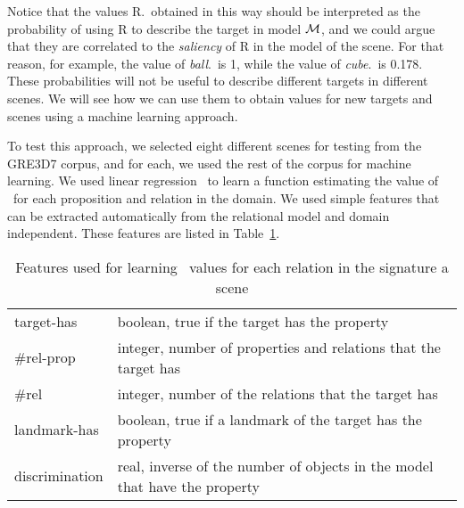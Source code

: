 Notice that the values R.\puse\ obtained in this way should be interpreted as the probability of using R to describe the target in model $\mathcal{M}$, and we could argue that they are correlated to the \emph{saliency} of R in the model of the scene.  
For that reason, for example, the value of \emph{ball}.\puse\ is 1, while the value of \emph{cube}.\puse\ is 0.178.  These probabilities will not be useful to describe different targets in different scenes.  We will see how we can use them to obtain values for new targets and scenes using a machine learning approach. 




To test this approach, we selected eight different scenes for testing from the GRE3D7 corpus, and for each, we used the rest of the corpus for machine learning. We used linear regression~\cite{Hall:WEK09} to learn a function estimating the value of \puse\ for each proposition and relation in the domain.  We used simple features that can be extracted automatically from the relational model and domain independent. These features are listed in Table~\ref{features}.  

\begin{small}
\begin{table}[h!]
\begin{center}
\begin{tabular}{|l|p{10cm}|} 
\hline
\small target-has     & \small boolean, true if the target has the property \\
\small \#rel-prop     & \small integer, number of properties and relations that the target has\\
\small \#rel          & \small integer, number of the relations that the target has \\
\small landmark-has   & \small boolean, true if a landmark of the target has the property\\
\small discrimination & \small real,  inverse of the number of objects in the model that have the property \\
\hline
\end{tabular}
\caption{Features used for learning \puse\ values for each relation in the signature a scene}\label{features}
\end{center}
\end{table}
\end{small}

